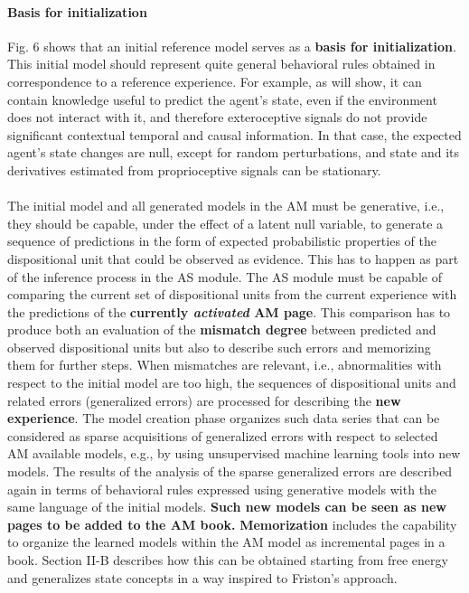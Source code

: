 \documentclass{article}
\begin{document}
		\paragraph{Basis for initialization} \citet{regazzoni-2020-multi-sensorial-generative-and-descriptive-self-awareness-models-for-autonomous-systems}Fig. 6 shows that
		an initial reference model serves as a \textbf{basis for initialization}.
		This initial model should represent quite general behavioral rules obtained in correspondence to a reference experience. For example, as \citet{regazzoni-2020-multi-sensorial-generative-and-descriptive-self-awareness-models-for-autonomous-systems} will show, it can contain knowledge useful to
		predict the agent’s state, even if the environment does not interact with it, and therefore exteroceptive signals do not provide significant contextual temporal and causal information. In that case, the expected agent’s state changes are null, except for random perturbations, and state and its derivatives estimated from proprioceptive signals can be stationary.
		\paragraph{}The initial model and all generated models in the AM must be generative, i.e., they should be capable, under the effect of a latent null variable, to generate a sequence of predictions in the form of expected probabilistic properties of the dispositional unit that could be observed as evidence. This has to happen as part of the inference process in the AS
		module. The AS module must be capable of comparing the current set of dispositional units from the current experience with the predictions of the \textbf{currently \emph{activated} AM page}. This comparison has to produce both an evaluation of the \textbf{mismatch degree} between predicted and observed dispositional units but also to describe such errors and memorizing them for further steps. When mismatches are relevant, i.e., abnormalities with respect to the initial model are too high, the sequences of dispositional units and related errors (generalized errors) are processed for describing the \textbf{new experience}. The model creation phase organizes such data series that can be considered
		as sparse acquisitions of generalized errors with respect to
		selected AM available models, e.g., by using unsupervised
		machine learning tools into new models. The results of the
		analysis of the sparse generalized errors are described again
		in terms of behavioral rules expressed using generative models
		with the same language of the initial models. \textbf{Such new models
		can be seen as new pages to be added to the AM book.}
		\textbf{Memorization} includes the capability to organize the learned
		models within the AM model as incremental pages in a book.
		\citet{regazzoni-2020-multi-sensorial-generative-and-descriptive-self-awareness-models-for-autonomous-systems} Section II-B describes how this can be obtained starting from
		free energy and generalizes state concepts in a way inspired
		to Friston’s approach.
\end{document}
